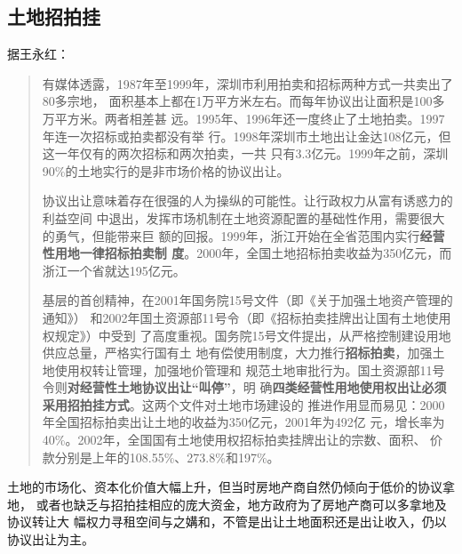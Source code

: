 
\subsection{土地招拍挂}
据王永红：
\begin{quotation}
  有媒体透露，1987年至1999年，深圳市利用拍卖和招标两种方式一共卖出了80多宗地，
  面积基本上都在1万平方米左右。而每年协议出让面积是100多万平方米。两者相差甚
  远。1995年、1996年还一度终止了土地拍卖。1997年连一次招标或拍卖都没有举
  行。1998年深圳市土地出让金达108亿元，但这一年仅有的两次招标和两次拍卖，一共
  只有3.3亿元。1999年之前，深圳90\%的土地实行的是非市场价格的协议出让。

  协议出让意味着存在很强的人为操纵的可能性。让行政权力从富有诱惑力的利益空间
  中退出，发挥市场机制在土地资源配置的基础性作用，需要很大的勇气，但能带来巨
  额的回报。1999年，浙江开始在全省范围内实行\textbf{经营性用地一律招标拍卖制
    度}。2000年，全国土地招标拍卖收益为350亿元，而浙江一个省就达195亿元。

  基层的首创精神，在2001年国务院15号文件（即《关于加强土地资产管理的通知》）
  和2002年国土资源部11号令（即《招标拍卖挂牌出让国有土地使用权规定》）中受到
  了高度重视。国务院15号文件提出，从严格控制建设用地供应总量，严格实行国有土
  地有偿使用制度，大力推行\textbf{招标拍卖}，加强土地使用权转让管理，加强地价管理和
  规范土地审批行为。国土资源部11号令则\textbf{对经营性土地协议出让“叫停”}，明
  确\textbf{四类经营性用地使用权出让必须采用招拍挂方式}。这两个文件对土地市场建设的
  推进作用显而易见：2000年全国招标拍卖出让土地的收益为350亿元，2001年为492亿
  元，增长率为40\%。2002年，全国国有土地使用权招标拍卖挂牌出让的宗数、面积、
  价款分别是上年的108.55\%、273.8\%和197\%。
\end{quotation}

土地的市场化、资本化价值大幅上升，但当时房地产商自然仍倾向于低价的协议拿地，
或者也缺乏与招拍挂相应的庞大资金，地方政府为了房地产商可以多拿地及协议转让大
幅权力寻租空间与之媾和，不管是出让土地面积还是出让收入，仍以协议出让为主。

